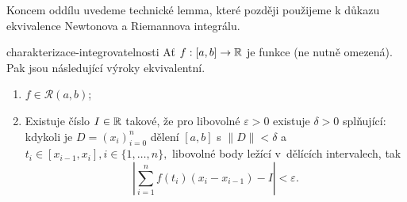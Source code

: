 Koncem oddílu uvedeme technické lemma, které později použijeme k důkazu
ekvivalence Newtonova a Riemannova integrálu.

\begin{lemma}{}{charakterizace-integrovatelnosti}
 Ať $f:[a,b] \to \mathbb{R}$ je funkce (ne nutně omezená). Pak jsou následující výroky
 ekvivalentní.
 \begin{enumerate}
  \item $f \in \mathcal{R}(a,b)$;
  \item Existuje číslo $I \in \mathbb{R}$ takové, že pro libovolné $\varepsilon>0$
   existuje $\delta>0$ splňující: kdykoli je $D = (x_i)_{i=0}^{n}$ dělení
   $[a,b]$ s $\|D\|<\delta$ a $t_i \in [x_{i-1},x_i], i \in \{1,\ldots,n\},$
   libovolné body ležící v~dělících intervalech, tak
   \begin{equation}
    \label{eq:charakterizace-integrovatelnosti}
    \left| \sum_{i = 1}^{n} f(t_i)(x_i - x_{i-1}) - I \right| < \varepsilon.
   \end{equation}
 \end{enumerate}
\end{lemma}
